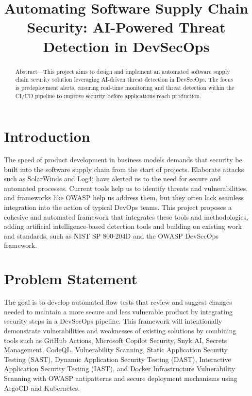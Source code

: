 \documentclass[conference]{IEEEtran}
\title{Automating Software Supply Chain Security: AI-Powered Threat Detection in DevSecOps}
\author{
    \IEEEauthorblockN{Marlon Brenes Rojas}
    \IEEEauthorblockA{
        Student ID: 1314316 \\
        Master's in Cybersecurity \\
        NYIT - Vancouver \\
        \href{mailto:marlon.brenes@nyit.edu}{mbrenesr@nyit.edu}
    }
}
\begin{document}
\maketitle

\begin{abstract}
Abstract—This project aims to design and implement an automated software supply chain security solution leveraging AI-driven threat detection in DevSecOps. The focus is predeployment alerts, ensuring real-time monitoring and threat detection within the CI/CD pipeline to improve security before applications reach production.
\end{abstract}

\section{Introduction}
The speed of product development in business models demands that security be built into the software supply chain from the start of projects. Elaborate attacks such as SolarWinds and Log4j have alerted us to the need for secure and automated processes. Current tools help us to identify threats and vulnerabilities, and frameworks like OWASP help us address them, but they often lack seamless integration into the action of typical DevOps teams. This project proposes a cohesive and automated framework that integrates these tools and methodologies, adding artificial intelligence-based detection tools and building on existing work and standards, such as \cite{NIST2020} NIST SP 800-204D and the \cite{OWASP} OWASP DevSecOps framework.

\section{Problem Statement}
The goal is to develop automated flow tests that review and suggest changes needed to maintain a more secure and less vulnerable product by integrating security steps in a DevSecOps pipeline. This framework will intentionally demonstrate vulnerabilities and weaknesses of existing solutions by combining tools such as GitHub Actions, Microsoft Copilot Security, Snyk AI, Secrets Management, CodeQL, Vulnerability Scanning, Static Application Security Testing (SAST), Dynamic Application Security Testing (DAST), Interactive Application Security Testing (IAST), and Docker Infrastructure Vulnerability Scanning with OWASP antipatterns and secure deployment mechanisms using ArgoCD and Kubernetes.
\end{document}
